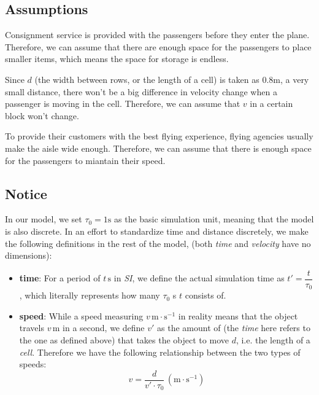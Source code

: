 \documentclass{article}
\theoremstyle{definition}
\theoremstyle{remark}
\numberwithin{equation}{section}
\begin{document}
	\subsection{Assumptions}
	\begin{enumerate}

		Consignment service is provided with the passengers before they enter the plane. Therefore, we can assume that there are enough space for the passengers to place smaller items, which means the space for storage is endless.

		Since $d$ (the width between rows, or the length of a cell) is taken as 0.8$\mathrm{m}$, a very small distance, there won't be a big difference in velocity change when a passenger is moving in the cell. Therefore, we can assume that $v$ in a certain block won't change.

		To provide their customers with the best flying experience, flying agencies usually make the aisle wide enough.  Therefore, we can assume that there is enough space for the passengers to miantain their speed.
	\end{enumerate}
	\subsection{Notice}
	In our model, we set \(\tau_0=1\mathrm{s}\) as the basic simulation unit, meaning that the model is also discrete. In an effort to standardize time and distance discretely, we make the following definitions in the rest of the model, (both \textit{time} and \textit{velocity} have no dimensions):
	\begin{itemize}
		\item \textbf{time}:
			For a period of \(t\,\mathrm{s}\) in \textit{SI}, we define the actual simulation time as \(t'=\dfrac{t}{\tau_0}\), which literally represents how many \(\tau_0\) s \(t\) consists of.
		\item \textbf{speed}:
			While a speed measuring \(v\,\mathrm{m\cdot s^{-1}}\) in reality means that the object travels \(v\,\mathrm{m}\) in a second, we define  \(v'\) as the amount of  (the \textit{time} here refers to the one as defined above) that takes the object to move \(d\), i.e. the length of a \textit{cell}. Therefore we have the following relationship between the two types of speeds:\[v=\dfrac{d}{v'\cdot \tau_0}\,\left(\mathrm{m\cdot s^{-1}}\right)\]
	\end{itemize}
\end{document}
